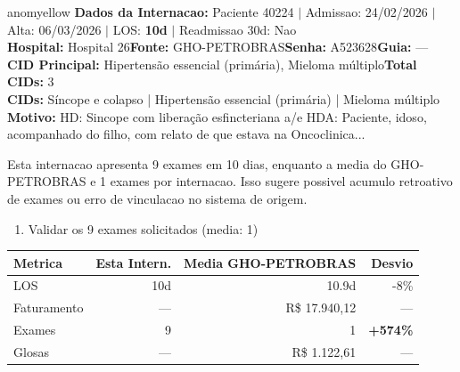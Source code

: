 \documentclass[a4paper,10pt]{article}
\begin{document}
\begin{anomalycard}[Internacao 166636 | GHO-PETROBRAS | MODERADO (z=2.09)]{anomyellow}
\textbf{Dados da Internacao:} Paciente 40224 $\mid$ Admissao: 24/02/2026 $\mid$ Alta: 06/03/2026 $\mid$ LOS: \textbf{10d} $\mid$ Readmissao 30d: Nao\\
\textbf{Hospital:} Hospital 26\quad\textbf{Fonte:} GHO-PETROBRAS\quad\textbf{Senha:} A523628\quad\textbf{Guia:} ---\\
\textbf{CID Principal:} {\small Hipertensão essencial (primária), Mieloma múltiplo}\quad\textbf{Total CIDs:} 3\\

\textbf{CIDs:} {\scriptsize Síncope e colapso | Hipertensão essencial (primária) | Mieloma múltiplo}\\

\textbf{Motivo:} {\scriptsize HD: Sincope com liberação esfincteriana a/e  HDA: Paciente, idoso, acompanhado do filho, com relato de que estava na Oncoclinica...}\\

\vspace{2pt}\begin{tcolorbox}[colback=severityred!20,colframe=anomyellow,title={\textbf{Interpretacao de Negocio}},fonttitle=\bfseries\small,left=4pt,right=4pt,top=3pt,bottom=3pt]
{\small Esta internacao apresenta 9 exames em 10 dias, enquanto a media do GHO-PETROBRAS e 1 exames por internacao. Isso sugere possivel acumulo retroativo de exames ou erro de vinculacao no sistema de origem.}
\end{tcolorbox}
\begin{tcolorbox}[colback=severityyellow!30,colframe=anomorange,title={\textbf{Recomendacoes Especificas}},fonttitle=\bfseries\small,left=4pt,right=4pt,top=3pt,bottom=3pt]
\begin{enumerate}[nosep,leftmargin=16pt]
\item {\small Validar os 9 exames solicitados (media: 1)}
\end{enumerate}
\end{tcolorbox}
\begin{center}\begin{tabular}{l r r r}\toprule\textbf{Metrica} & \textbf{Esta Intern.} & \textbf{Media GHO-PETROBRAS} & \textbf{Desvio} \\\midrule
LOS & 10d & 10.9d & -8\% \\
Faturamento & --- & R\$ 17.940,12 & --- \\
Exames & 9 & 1 & \textcolor{anomred}{\textbf{+574\%}} \\
Glosas & --- & R\$ 1.122,61 & --- \\
\bottomrule\end{tabular}\end{center}


\end{anomalycard}
\end{document}

